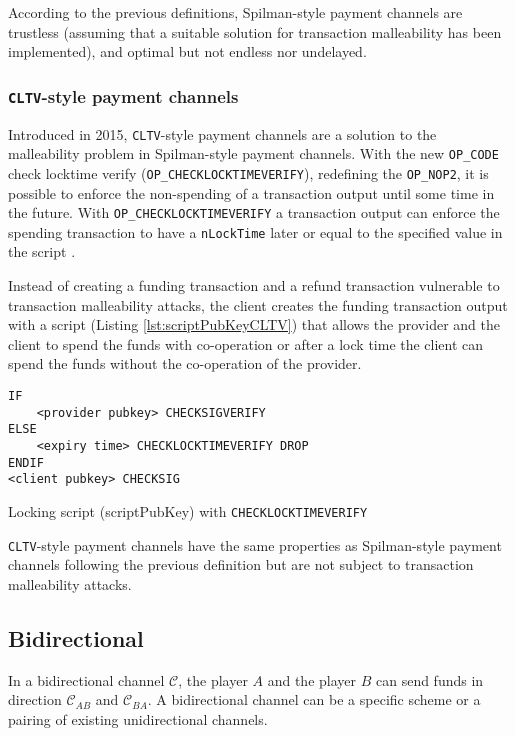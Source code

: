According to the previous definitions, Spilman-style payment channels are
trustless (assuming that a suitable solution for transaction malleability has
been implemented), and optimal but not endless nor undelayed.

\subsubsection{\texttt{CLTV}-style payment channels}

Introduced in 2015, \texttt{CLTV}-style payment channels are a solution to the malleability
problem in Spilman-style payment channels. With the new \texttt{OP\_CODE} check
locktime verify (\texttt{OP\_CHECKLOCKTIMEVERIFY}), redefining the
\texttt{OP\_NOP2}, it is possible to enforce the non-spending of a transaction
output until some time in the future. With \texttt{OP\_CHECKLOCKTIMEVERIFY} a
transaction output can enforce the spending transaction to have a
\texttt{nLockTime} later or equal to the specified value in the script
\cite{BIP65}.

Instead of creating a funding transaction and a refund transaction vulnerable to
transaction malleability attacks, the client creates the funding transaction
output with a script (Listing \ref{lst:scriptPubKeyCLTV}) that allows the
provider and the client to spend the funds
with co-operation or after a lock time the client can spend the funds without
the co-operation of the provider.

\begin{listing}
  \begin{verbatim}
IF
    <provider pubkey> CHECKSIGVERIFY
ELSE
    <expiry time> CHECKLOCKTIMEVERIFY DROP
ENDIF
<client pubkey> CHECKSIG
  \end{verbatim}
	\caption{Locking script (scriptPubKey) with \texttt{CHECKLOCKTIMEVERIFY}}
	\label{lst:scriptPubKeyCLTV}
\end{listing}

\texttt{CLTV}-style payment channels have the same properties as Spilman-style payment
channels following the previous definition but are not subject to transaction
malleability attacks.

\subsection{Bidirectional}

In a bidirectional channel $\mathcal{C}$, the player $A$ and the player $B$ can
send funds in direction $\mathcal{C}_{AB}$ and $\mathcal{C}_{BA}$. A
bidirectional channel can be a specific scheme or a pairing of existing
unidirectional channels.

